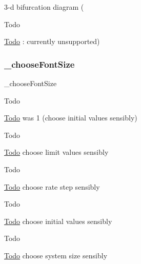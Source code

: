 3-\/d bifurcation diagram ( 

\begin{DoxyRefDesc}{Todo}
\item[\hyperlink{todo__todo000035}{Todo}]\+: currently unsupported) \end{DoxyRefDesc}
\mbox{\label{class_mu_mo_t_1_1_mu_mo_tbifurcation_view_a6a353a1ef9443ae375948d592ed6cec6}} 
\subsubsection{\texorpdfstring{\+\_\+choose\+Font\+Size}{\_chooseFontSize}}
{\footnotesize\ttfamily \+\_\+choose\+Font\+Size\hspace{0.3cm}{\ttfamily [private]}}

\begin{DoxyRefDesc}{Todo}
\item[\hyperlink{todo__todo000039}{Todo}]was 1 (choose initial values sensibly) \end{DoxyRefDesc}
\begin{DoxyRefDesc}{Todo}
\item[\hyperlink{todo__todo000040}{Todo}]choose limit values sensibly \end{DoxyRefDesc}
\begin{DoxyRefDesc}{Todo}
\item[\hyperlink{todo__todo000041}{Todo}]choose rate step sensibly \end{DoxyRefDesc}
\begin{DoxyRefDesc}{Todo}
\item[\hyperlink{todo__todo000042}{Todo}]choose initial values sensibly \end{DoxyRefDesc}
\begin{DoxyRefDesc}{Todo}
\item[\hyperlink{todo__todo000043}{Todo}]choose system size sensibly \end{DoxyRefDesc}
\mbox{\label{class_mu_mo_t_1_1_mu_mo_tbifurcation_view_a5c3de6779b1f8c64730cee48ca65491d}} 
